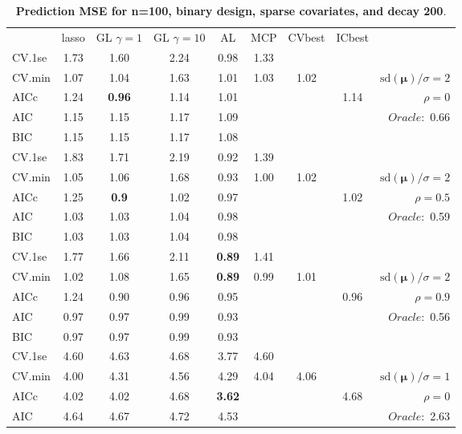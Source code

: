 \clearpage
\begin{table}\vspace{-.5cm}
\caption[l]{ { \bf Prediction MSE for n=100, binary design, 
sparse covariates, and  decay  200}.}
\vspace{-.5cm}
\footnotesize{}
\begin{center}
\begin{tabular}{l*{7}{c}|r}
 & lasso & GL $\gamma=1$ & GL $\gamma=10$ & AL & MCP  & CVbest & ICbest  \\
\cline{1-9}
CV.1se & 1.73 & 1.60 & 2.24 & 0.98 & 1.33 & & & \\
CV.min & 1.07 & 1.04 & 1.63 & 1.01 & 1.03 & 1.02 & & $\mathrm{sd}(\mathbf{\mu})/\sigma=2$ \\
AICc & 1.24 & {\bf 0.96} & 1.14 & 1.01 & & & 1.14 &  $\rho=0$ \\
AIC & 1.15 & 1.15 & 1.17 & 1.09 & & & &  \multirow{2}{*}{$Oracle: $ 0.66} \\
BIC & 1.15 & 1.15 & 1.17 & 1.08 & & & &  \\
 \hline 
CV.1se & 1.83 & 1.71 & 2.19 & 0.92 & 1.39 & & & \\
CV.min & 1.05 & 1.06 & 1.68 & 0.93 & 1.00 & 1.02 & & $\mathrm{sd}(\mathbf{\mu})/\sigma=2$ \\
AICc & 1.25 & {\bf 0.9} & 1.02 & 0.97 & & & 1.02 &  $\rho=0.5$ \\
AIC & 1.03 & 1.03 & 1.04 & 0.98 & & & &  \multirow{2}{*}{$Oracle: $ 0.59} \\
BIC & 1.03 & 1.03 & 1.04 & 0.98 & & & &  \\
 \hline 
CV.1se & 1.77 & 1.66 & 2.11 & {\bf 0.89} & 1.41 & & & \\
CV.min & 1.02 & 1.08 & 1.65 & {\bf 0.89} & 0.99 & 1.01 & & $\mathrm{sd}(\mathbf{\mu})/\sigma=2$ \\
AICc & 1.24 & 0.90 & 0.96 & 0.95 & & & 0.96 &  $\rho=0.9$ \\
AIC & 0.97 & 0.97 & 0.99 & 0.93 & & & &  \multirow{2}{*}{$Oracle: $ 0.56} \\
BIC & 0.97 & 0.97 & 0.99 & 0.93 & & & &  \\
 \hline 
CV.1se & 4.60 & 4.63 & 4.68 & 3.77 & 4.60 & & & \\
CV.min & 4.00 & 4.31 & 4.56 & 4.29 & 4.04 & 4.06 & & $\mathrm{sd}(\mathbf{\mu})/\sigma=1$ \\
AICc & 4.02 & 4.02 & 4.68 & {\bf 3.62} & & & 4.68 &  $\rho=0$ \\
AIC & 4.64 & 4.67 & 4.72 & 4.53 & & & &  \multirow{2}{*}{$Oracle: $ 2.63} \\

\end{tabular}
\end{center}
\end{table}

